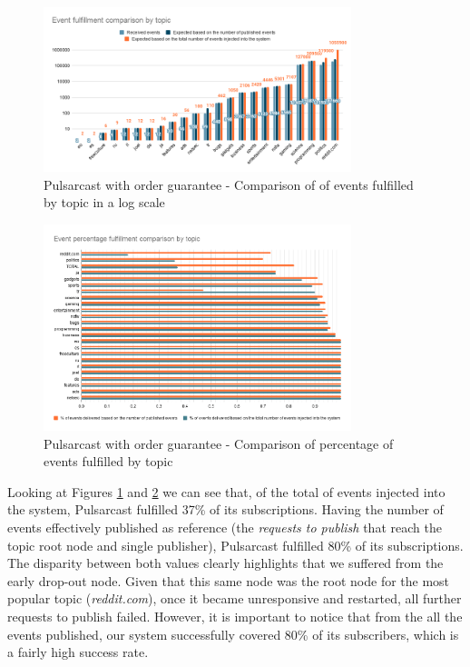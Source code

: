 \begin{figure}[!htb]
  \centering
  \includegraphics[width=0.8\textwidth]{img/graph-pulsarcast-order-event-fulfillment-comparison.png}
  \caption{Pulsarcast with order guarantee - Comparison of of events fulfilled by topic in a log scale}
  \label{fig:graph-pulsarcast-order-event-fulfillment-comparison}
\end{figure}

\begin{figure}[!htb]
  \centering
  \includegraphics[width=0.8\textwidth]{img/graph-pulsarcast-order-event-percentage-fulfillment-comparison.png}
  \caption{Pulsarcast with order guarantee - Comparison of percentage of events fulfilled by topic}
  \label{fig:graph-pulsarcast-order-event-percentage-fulfillment-comparison}
\end{figure}

Looking at Figures
\ref{fig:graph-pulsarcast-order-event-fulfillment-comparison} and
\ref{fig:graph-pulsarcast-order-event-percentage-fulfillment-comparison} we can
see that, of the total of events injected into the system, Pulsarcast fulfilled
37\% of its subscriptions. Having the number of events effectively published as
reference (the \emph{requests to publish} that reach the topic root node and
single publisher), Pulsarcast fulfilled 80\% of its subscriptions. The
disparity between both values clearly highlights that we suffered from the
early drop-out node. Given that this same node was the root node for the most
popular topic (\emph{reddit.com}), once it became unresponsive and restarted,
all further requests to publish failed. However, it is important to notice
that from the all the events published, our system successfully covered 80\% of
its subscribers, which is a fairly high success rate.

